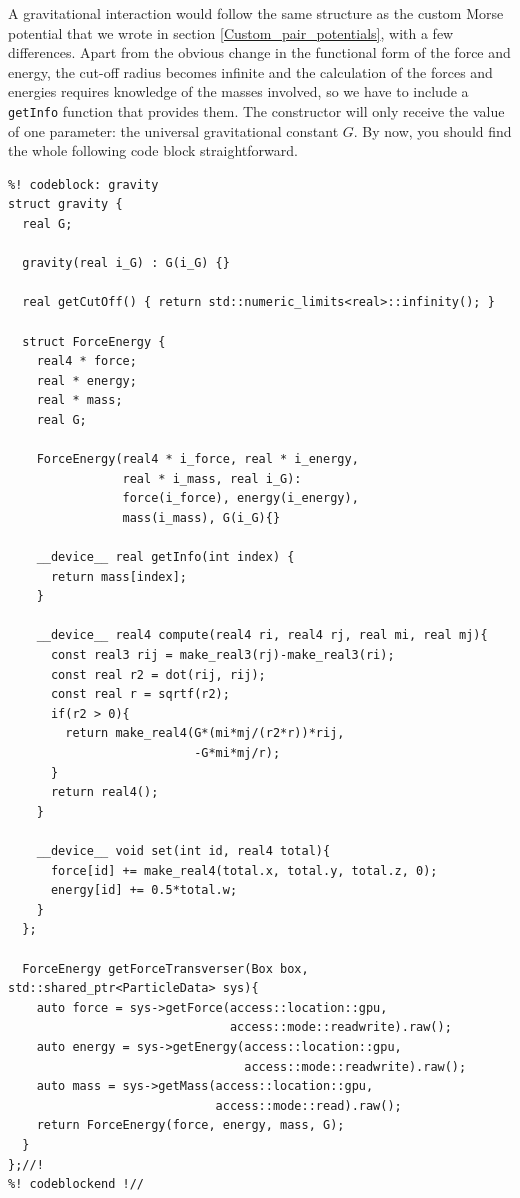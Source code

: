 A gravitational interaction would follow the same structure as the custom Morse 
potential that we wrote in section \ref{Custom_pair_potentials}, with a few 
differences. Apart from the obvious change in the functional form of the force 
and energy, the cut-off radius becomes infinite and the calculation of the 
forces and energies requires knowledge of the masses involved, so we have to 
include a \texttt{getInfo} function that provides them. The constructor will 
only receive the value of one parameter: the universal gravitational constant 
$G$. By now, you should find the whole following code block straightforward.
\begin{lstlisting}
%! codeblock: gravity
struct gravity {
  real G;

  gravity(real i_G) : G(i_G) {}

  real getCutOff() { return std::numeric_limits<real>::infinity(); }

  struct ForceEnergy {
    real4 * force;
    real * energy;
    real * mass;
    real G;

    ForceEnergy(real4 * i_force, real * i_energy,
                real * i_mass, real i_G):
                force(i_force), energy(i_energy),
                mass(i_mass), G(i_G){}

    __device__ real getInfo(int index) {
      return mass[index];
    }

    __device__ real4 compute(real4 ri, real4 rj, real mi, real mj){
      const real3 rij = make_real3(rj)-make_real3(ri);
      const real r2 = dot(rij, rij);
      const real r = sqrtf(r2);
      if(r2 > 0){
        return make_real4(G*(mi*mj/(r2*r))*rij,
                          -G*mi*mj/r);
      }
      return real4();
    }

    __device__ void set(int id, real4 total){
      force[id] += make_real4(total.x, total.y, total.z, 0);
      energy[id] += 0.5*total.w;
    }
  };

  ForceEnergy getForceTransverser(Box box, std::shared_ptr<ParticleData> sys){
    auto force = sys->getForce(access::location::gpu,
                               access::mode::readwrite).raw();
    auto energy = sys->getEnergy(access::location::gpu,
                                 access::mode::readwrite).raw();
    auto mass = sys->getMass(access::location::gpu,
                             access::mode::read).raw();
    return ForceEnergy(force, energy, mass, G);
  }
};//!
%! codeblockend !//
\end{lstlisting}


